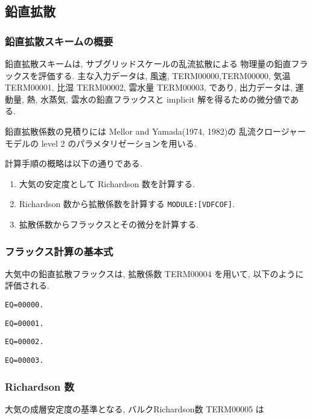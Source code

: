﻿
\subsection{鉛直拡散}

\subsubsection{鉛直拡散スキームの概要}

鉛直拡散スキームは,
サブグリッドスケールの乱流拡散による
物理量の鉛直フラックスを評価する.
主な入力データは, 風速, TERM00000,TERM00000, 気温 TERM00001, 比湿 TERM00002, 雲水量 TERM00003, であり,
出力データは, 運動量, 熱, 水蒸気, 雲水の鉛直フラックスと
implicit 解を得るための微分値である.

鉛直拡散係数の見積りには
Mellor and Yamada(1974, 1982)の
乱流クロージャーモデルの
level 2 のパラメタリゼーションを用いる.

計算手順の概略は以下の通りである.
\begin{enumerate}
\item 大気の安定度として
      Richardson 数を計算する.
\item Richardson 数から拡散係数を計算する \texttt{MODULE:[VDFCOF]}.
\item 拡散係数からフラックスとその微分を計算する.
\end{enumerate}

\subsubsection{フラックス計算の基本式}

大気中の鉛直拡散フラックスは, 
拡散係数 TERM00004 を用いて, 以下のように評価される.

\begin{verbatim}
EQ=00000.
\end{verbatim}
\begin{verbatim}
EQ=00001.
\end{verbatim}
\begin{verbatim}
EQ=00002.
\end{verbatim}
\begin{verbatim}
EQ=00003.
\end{verbatim}

\subsubsection{Richardson 数}

大気の成層安定度の基準となる,
バルクRichardson数 TERM00005 は

